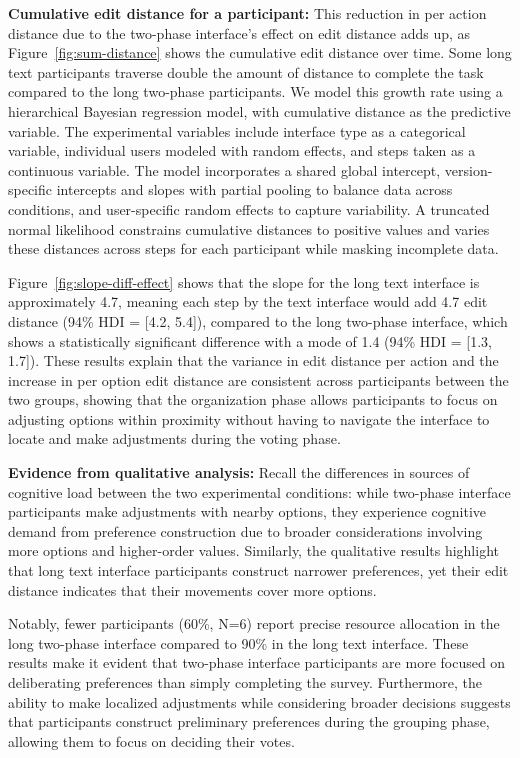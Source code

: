 \textbf{Cumulative edit distance for a participant:} This reduction in per action distance due to the two-phase interface's effect on edit distance adds up, as Figure~\ref{fig:sum-distance} shows the cumulative edit distance over time. Some long text participants traverse double the amount of distance to complete the task compared to the long two-phase participants. We model this growth rate using a hierarchical Bayesian regression model, with cumulative distance as the predictive variable. The experimental variables include interface type as a categorical variable, individual users modeled with random effects, and steps taken as a continuous variable. The model incorporates a shared global intercept, version-specific intercepts and slopes with partial pooling to balance data across conditions, and user-specific random effects to capture variability. A truncated normal likelihood constrains cumulative distances to positive values and varies these distances across steps for each participant while masking incomplete data.

Figure~\ref{fig:slope-diff-effect} shows that the slope for the long text interface is approximately 4.7, meaning each step by the text interface would add 4.7 edit distance (94\% HDI = [4.2, 5.4]), compared to the long two-phase interface, which shows a statistically significant difference with a mode of 1.4 (94\% HDI = [1.3, 1.7]). These results explain that the variance in edit distance per action and the increase in per option edit distance are consistent across participants between the two groups, showing that the organization phase allows participants to focus on adjusting options within proximity without having to navigate the interface to locate and make adjustments during the voting phase.

\textbf{Evidence from qualitative analysis:} Recall the differences in sources of cognitive load between the two experimental conditions: while two-phase interface participants make adjustments with nearby options, they experience cognitive demand from preference construction due to broader considerations involving more options and higher-order values. Similarly, the qualitative results highlight that long text interface participants construct narrower preferences, yet their edit distance indicates that their movements cover more options.

Notably, fewer participants (60\%, N=6) report precise resource allocation in the long two-phase interface compared to 90\% in the long text interface. These results make it evident that two-phase interface participants are more focused on deliberating preferences than simply completing the survey. Furthermore, the ability to make localized adjustments while considering broader decisions suggests that participants construct preliminary preferences during the grouping phase, allowing them to focus on deciding their votes.

